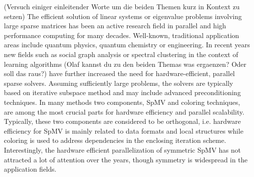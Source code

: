 {\GW (Versuch einiger einleitender Worte um die beiden Themen kurz in Kontext zu setzen)}
The efficient solution of linear systems or eigenvalue problems involving large sparse matrices has been an active research field in parallel and high performance computing for many decades. Well-known, traditional application areas include quantum physics, quantum chemistry or engineering. In recent years new fields such as social graph analysis or spectral clustering in the context of learning algorithms ({\GW Olaf kannst du zu den beiden Themas was ergaenzen? Oder soll das raus?)} have further increased the need for hardware-efficient, parallel sparse solvers. Assuming sufficiently large problems, the solvers are typically based on iterative subspace method and may include advanced preconditioning techniques. In many methods two components,  \acrfull{SpMV}  and coloring techniques, are among the most crucial parts for hardware efficiency and parallel scalability. Typically, these two components are considered to be orthogonal, i.e. hardware efficiency for \Acrshort{SpMV} is mainly related to data formats and local structures while coloring is used to address dependencies in the enclosing iteration scheme.  Interestingly, the hardware efficient parallelization of symmetric \Acrshort{SpMV} has not attracted a lot of attention over the years, though symmetry is widespread in the application fields. 

